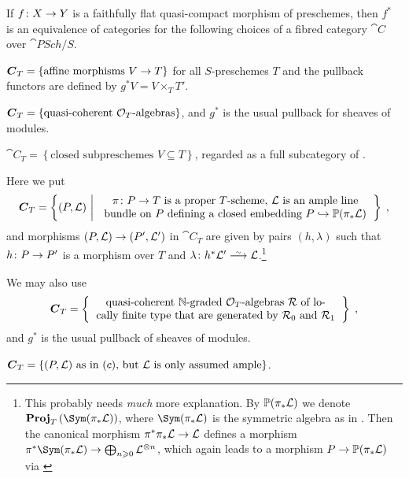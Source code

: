 \documentclass[a4paper,parskip=half,numbers=enddot, DIV=12]{scrreprt}
\renewcommand{\geq}{\geqslant}
\begin{document}
\begin{cor}
	If $f\colon X\morphism Y$ is a faithfully flat quasi-compact morphism of preschemes, then $f^*$ is an equivalence of categories for the following choices of a fibred category $\cat C$ over $\cat{PSch}/S$.
	\begin{alphanumerate}
		\item $\cat C_T=\left\{\text{affine morphisms }V\morphism T\right\}$ for all $S$-preschemes $T$ and the pullback functors are defined by $g^*V=V\times_TT'$.
		\item[\itememph{a'}] $\cat C_T=\left\{\text{quasi-coherent }\Oo_T\text{-algebras}\right\}$, and $g^*$ is the usual pullback for sheaves of modules.
		\item $\cat C_T=\left\{\text{closed subpreschemes }V\subseteq T\right\}$, regarded as a full subcategory of .
		\item Here we put
		\begin{align*}
			\cat C_T=\left\{(P,\Ll)\st\begin{tabular}{c}
				$\pi\colon P\morphism T$ is a proper $T$-scheme, $\Ll$ is an ample line\\
				bundle on $P$ defining a closed embedding $P\monomorphism \IP(\pi_*\Ll)$
			\end{tabular}\right\}\;,
		\end{align*}
		and morphisms $(P,\Ll)\morphism (P',\Ll')$ in $\cat C_T$ are given by pairs $(h,\lambda)$ such that $h\colon P\morphism P'$ is a morphism over $T$ and $\lambda\colon h^*\Ll'\isomorphism \Ll$.\footnote{This probably needs \emph{much} more explanation. By $\mathbb{P}(\pi_*\mathcal{L})$ we denote $\PROJ_T\left(\Sym(\pi_*\Ll)\right)$, where $\Sym(\pi_*\Ll)$ is the symmetric algebra as in \cite[p.~67]{alggeo2}. Then the canonical morphism $\pi^*\pi_*\Ll\morphism\Ll$ defines a morphism $\pi^*\Sym(\pi_*\Ll)\morphism \bigoplus_{n\geq 0}\Ll^{\otimes n}$, which again leads to a morphism $P\morphism\IP(\pi_*\Ll)$ via \cite[Corollary~2.3.1]{alggeo2}}
		\item[\itememph{c'}] We may also use
		\begin{align*}
			\cat C_T=\left\{\begin{tabular}{c}
				quasi-coherent $\IN$-graded $\Oo_T$-algebras $\Rr$ of lo-\\
				cally finite type that are generated by $\Rr_0$ and $\Rr_1$
			\end{tabular}\right\}\;,
		\end{align*}
		and $g^*$ is the usual pullback of sheaves of modules.
		\item[\itememph{c''}] $\cat C_T=\left\{(P,\Ll)\text{ as in \itememph{c}, but }\Ll\text{ is only assumed ample}\right\}$.
	\end{alphanumerate}
\end{cor}
\end{document}
